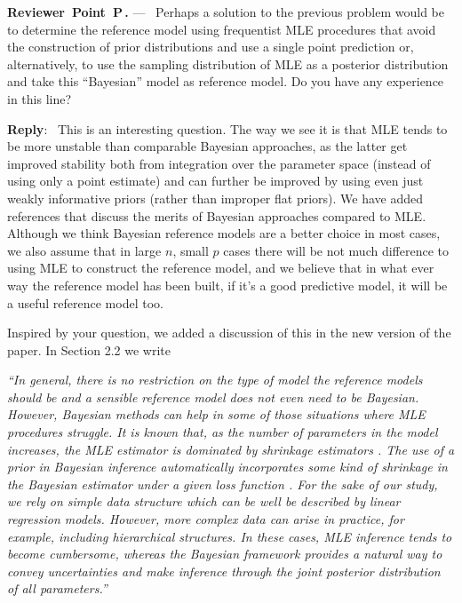 \documentclass[11pt]{article}
\newcounter{reviewer}
\newcounter{point}[reviewer]
\renewcommand{\thepoint}{P\,\thereviewer.\arabic{point}}
\newenvironment{point}
   {\refstepcounter{point} \bigskip \noindent \begin{sf}{\textbf{Reviewer~Point~\thepoint} } ---\ }
   {\par \end{sf}}
\newenvironment{reply}
   {\medskip \noindent \textbf{Reply}:\  }
   {\medskip}
\newcommand{\todo}{\subsection*{\textcolor{red}{To do (comment out when done)}:}}
\begin{document}

\begin{point}
Perhaps a solution to the previous problem would be to determine the reference model using frequentist MLE procedures that avoid the construction of prior distributions and use a single point prediction or, alternatively, to use the sampling distribution of MLE as a posterior distribution and take this “Bayesian” model as reference model. Do you have any experience in this line?
\end{point}

\begin{reply}
This is an interesting question. The way we see it is that MLE tends to be more unstable than comparable Bayesian approaches, as the latter get improved stability both from integration over the parameter space (instead of using only a point estimate) and can further be improved by using even just weakly informative priors (rather than improper flat priors). We have added references that discuss the merits of Bayesian approaches compared to MLE. Although we think Bayesian reference models are a better choice in most cases, we also assume that in large $n$, small $p$ cases there will be not much difference to using MLE to construct the reference model, and we believe that in what ever way the reference model has been built, if it's a good predictive model, it will be a useful reference model too.

Inspired by your question, we added a discussion of this in the new version of the paper. In Section 2.2 we write

\vspace{0.5cm}

\textit{``In general, there is no restriction on the type of model the reference models 
	should be and a sensible reference model does not even need to be Bayesian.
	However, Bayesian methods can help in some of those situations
	where MLE procedures struggle. 
	It is known that, as the number of parameters in the model increases, the MLE
	estimator is dominated by shrinkage estimators 
	\citep{stein1956inadmissibility, stein1961estimation, parmigiani2009decision, efron2011tweedie}.
	The use of a prior in Bayesian inference automatically incorporates 
	some kind of shrinkage in the Bayesian estimator under a given loss function \citep[see, e.g.][]{rockova2012hierarchical}. 
	For the sake of our study, we rely on simple data structure which can be well be described 
	by linear regression models. However, more complex data can arise in practice, for example, including hierarchical structures. In these cases, MLE inference tends to become cumbersome, whereas the Bayesian framework provides a natural way to convey uncertainties and make inference through the joint posterior distribution of all parameters.''}

\vspace{0.5cm}

\end{reply}
\end{document}
